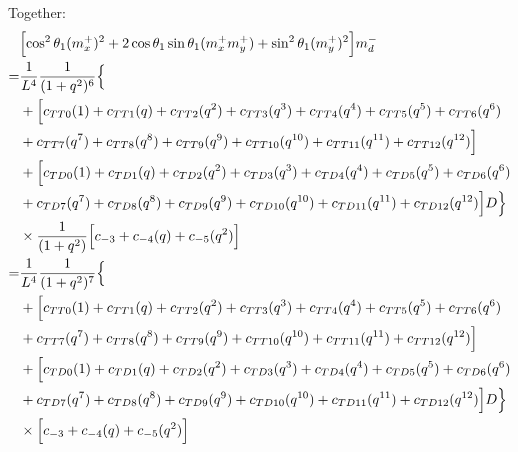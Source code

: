 \documentclass[12pt]{article}
\begin{document}
Together:
\begin{align}
    &\Bigl[ \cos^2\theta_1(m_x^+)^2  + 2\cos\theta_1\sin\theta_1(m_x^+m_y^+)  +\sin^2\theta_1(m_y^+)^2 \Bigr] m_d^-\\
    =&  \frac{1}{L^4} \frac{1}{(1+q^2)^6} \Bigl\{ \nonumber\\
    &+ \Bigl[ c_{TT0}(1) + c_{TT1}(q) + c_{TT2}(q^2) + c_{TT3}(q^3) + c_{TT4}(q^4) + c_{TT5}(q^5) + c_{TT6}(q^6) \nonumber\\
    &+ c_{TT7}(q^7) + c_{TT8}(q^8) + c_{TT9}(q^9) + c_{TT10}(q^{10}) + c_{TT11}(q^{11}) + c_{TT12}(q^{12}) \Bigr] \nonumber\\
    &+ \Bigl[ c_{TD0}(1) + c_{TD1}(q) + c_{TD2}(q^2) + c_{TD3}(q^3) + c_{TD4}(q^4) + c_{TD5}(q^5) + c_{TD6}(q^6) \nonumber\\
    &+ c_{TD7}(q^7) + c_{TD8}(q^8) + c_{TD9}(q^9) + c_{TD10}(q^{10}) + c_{TD11}(q^{11}) + c_{TD12}(q^{12}) \Bigr]D  \Bigr\}  \nonumber\\
    &\times \frac{1}{(1+q^2)} \Bigl[ c_{-3} + c_{-4}(q) + c_{-5}(q^2) \Bigr]\\
    =&  \frac{1}{L^4} \frac{1}{(1+q^2)^7} \Bigl\{ \nonumber\\
    &+ \Bigl[ c_{TT0}(1) + c_{TT1}(q) + c_{TT2}(q^2) + c_{TT3}(q^3) + c_{TT4}(q^4) + c_{TT5}(q^5) + c_{TT6}(q^6) \nonumber\\
    &+ c_{TT7}(q^7) + c_{TT8}(q^8) + c_{TT9}(q^9) + c_{TT10}(q^{10}) + c_{TT11}(q^{11}) + c_{TT12}(q^{12}) \Bigr] \nonumber\\
    &+ \Bigl[ c_{TD0}(1) + c_{TD1}(q) + c_{TD2}(q^2) + c_{TD3}(q^3) + c_{TD4}(q^4) + c_{TD5}(q^5) + c_{TD6}(q^6) \nonumber\\
    &+ c_{TD7}(q^7) + c_{TD8}(q^8) + c_{TD9}(q^9) + c_{TD10}(q^{10}) + c_{TD11}(q^{11}) + c_{TD12}(q^{12}) \Bigr]D  \Bigr\}  \nonumber\\
    &\times \Bigl[ c_{-3} + c_{-4}(q) + c_{-5}(q^2) \Bigr]
\end{align}
\end{document}
